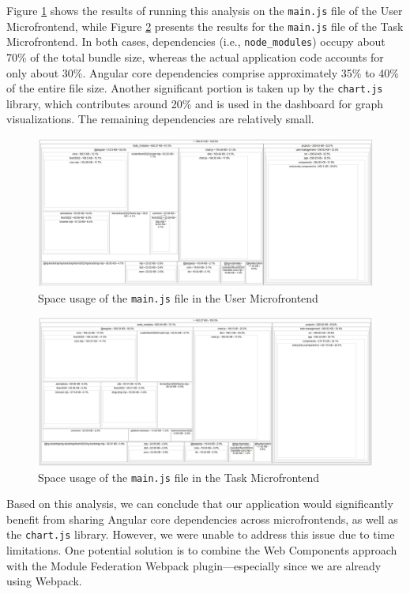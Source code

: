 Figure \ref{fig:user-usage} shows the results of running this analysis on the \texttt{main.js} file of the User Microfrontend, while Figure \ref{fig:task-usage} presents the results for the \texttt{main.js} file of the Task Microfrontend. In both cases, dependencies (i.e., \texttt{node\_modules}) occupy about 70\% of the total bundle size, whereas the actual application code accounts for only about 30\%. Angular core dependencies comprise approximately 35\% to 40\% of the entire file size. Another significant portion is taken up by the \texttt{chart.js} library, which contributes around 20\% and is used in the dashboard for graph visualizations. The remaining dependencies are relatively small.
\begin{figure}[h]
    \centerline{\includegraphics[width=1\textwidth]{images/user-space-usage.png}}
    \caption[Space usage of the User Microfrontend]{Space usage of the \texttt{main.js} file in the User Microfrontend}
    \label{fig:user-usage} 
\end{figure}
\begin{figure}[h]
    \centerline{\includegraphics[width=1\textwidth]{images/task-space-usage.png}}
    \caption[Space usage of the Task Microfrontend]{Space usage of the \texttt{main.js} file in the Task Microfrontend}
    \label{fig:task-usage} 
\end{figure}

Based on this analysis, we can conclude that our application would significantly benefit from sharing Angular core dependencies across microfrontends, as well as the \texttt{chart.js} library. However, we were unable to address this issue due to time limitations. One potential solution is to combine the Web Components approach with the Module Federation Webpack plugin—especially since we are already using Webpack.